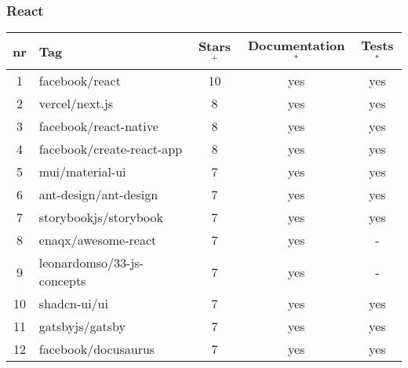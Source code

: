\subsubsection{React}

\begin{table}[H]
    \centering
    \begin{tabular}{|c|l|c|c|c|}
        \hline
        nr & \textbf{Tag}                        & \textbf{Stars}$^+$ & \textbf{Documentation}$^*$ & \textbf{Tests}$^*$ \\
        \hline
        1  & facebook/react                      & 10                 & yes                        & yes                \\ \hline
        2  & vercel/next.js                      & 8                  & yes                        & yes                \\ \hline
        3  & facebook/react-native               & 8                  & yes                        & yes                \\ \hline
        4  & facebook/create-react-app           & 8                  & yes                        & yes                \\ \hline
        5  & mui/material-ui                     & 7                  & yes                        & yes                \\ \hline
        6  & ant-design/ant-design               & 7                  & yes                        & yes                \\ \hline
        7  & storybookjs/storybook               & 7                  & yes                        & yes                \\ \hline
        8  & enaqx/awesome-react                 & 7                  & yes                        & -                  \\ \hline
        9  & leonardomso/33-js-concepts          & 7                  & yes                        & -                  \\ \hline
        10 & shadcn-ui/ui                        & 7                  & yes                        & yes                \\ \hline
        11 & gatsbyjs/gatsby                     & 7                  & yes                        & yes                \\ \hline
        12 & facebook/docusaurus                 & 7                  & yes                        & yes                \\ \hline

\end{tabular}
\end{table}

